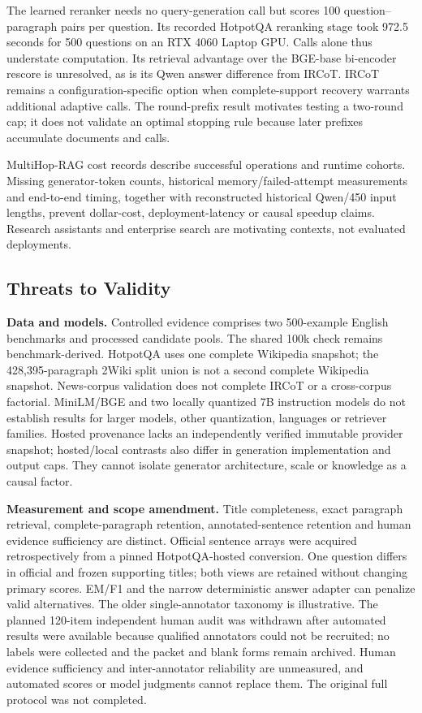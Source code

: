 The learned reranker needs no query-generation call but scores 100 question--paragraph pairs per question. Its recorded HotpotQA reranking stage took 972.5 seconds for 500 questions on an RTX 4060 Laptop GPU. Calls alone thus understate computation. Its retrieval advantage over the BGE-base bi-encoder rescore is unresolved, as is its Qwen answer difference from IRCoT. IRCoT remains a configuration-specific option when complete-support recovery warrants additional adaptive calls. The round-prefix result motivates testing a two-round cap; it does not validate an optimal stopping rule because later prefixes accumulate documents and calls.

MultiHop-RAG cost records describe successful operations and runtime cohorts. Missing generator-token counts, historical memory/failed-attempt measurements and end-to-end timing, together with reconstructed historical Qwen/450 input lengths, prevent dollar-cost, deployment-latency or causal speedup claims. Research assistants and enterprise search are motivating contexts, not evaluated deployments.

\subsection{Threats to Validity}
\label{sec:threats_to_validity}

\textbf{Data and models.} Controlled evidence comprises two 500-example English benchmarks and processed candidate pools. The shared 100k check remains benchmark-derived. HotpotQA uses one complete Wikipedia snapshot; the 428,395-paragraph 2Wiki split union is not a second complete Wikipedia snapshot. News-corpus validation does not complete IRCoT or a cross-corpus factorial. MiniLM/BGE and two locally quantized 7B instruction models do not establish results for larger models, other quantization, languages or retriever families. Hosted provenance lacks an independently verified immutable provider snapshot; hosted/local contrasts also differ in generation implementation and output caps. They cannot isolate generator architecture, scale or knowledge as a causal factor.

\textbf{Measurement and scope amendment.} Title completeness, exact paragraph retrieval, complete-paragraph retention, annotated-sentence retention and human evidence sufficiency are distinct. Official sentence arrays were acquired retrospectively from a pinned HotpotQA-hosted conversion. One question differs in official and frozen supporting titles; both views are retained without changing primary scores. EM/F1 and the narrow deterministic answer adapter can penalize valid alternatives. The older single-annotator taxonomy is illustrative. The planned 120-item independent human audit was withdrawn after automated results were available because qualified annotators could not be recruited; no labels were collected and the packet and blank forms remain archived. Human evidence sufficiency and inter-annotator reliability are unmeasured, and automated scores or model judgments cannot replace them. The original full protocol was not completed.

